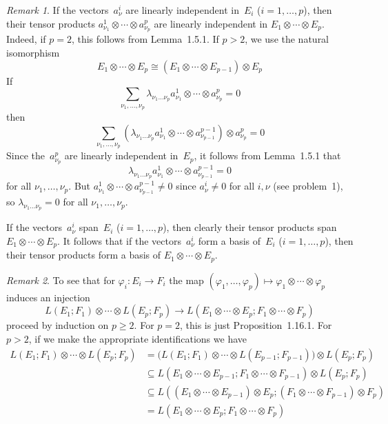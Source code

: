 \documentclass[letterpaper,12pt]{article}
\newcommand{\iso}{\cong}
\newcommand{\tprod}{\otimes}
\newcommand{\multi}[4]{#2_{#3}#1\cdots#1#2_{#4}}
\newcommand{\tprods}[3]{\multi{\tprod}{#1}{#2}{#3}}
\theoremstyle{definition}
\theoremstyle{remark}
\newtheorem*{rmk}{Remark}
\begin{document}
\begin{rmk}
If the vectors~\(a^i_{\nu}\) are linearly independent in~\(E_i\) (\(i=1,\ldots,p\)), then their tensor products \(a^1_{\nu_1}\tprod\cdots\tprod a^p_{\nu_p}\) are linearly independent in \(\tprods{E}{1}{p}\). Indeed, if \(p=2\), this follows from Lemma~1.5.1. If \(p>2\), we use the natural isomorphism
\[\tprods{E}{1}{p}\iso(\tprods{E}{1}{p-1})\tprod E_p\]
If
\[\sum_{\nu_1,\ldots,\nu_p}\lambda_{\nu_1\ldots\nu_p}a^1_{\nu_1}\tprod\cdots\tprod a^p_{\nu_p}=0\]
then
\[\sum_{\nu_1,\ldots,\nu_p}(\lambda_{\nu_1\ldots\nu_p}a^1_{\nu_1}\tprod\cdots\tprod a^{p-1}_{\nu_{p-1}})\tprod a^p_{\nu_p}=0\]
Since the~\(a^p_{\nu_p}\) are linearly independent in~\(E_p\), it follows from Lemma~1.5.1 that
\[\lambda_{\nu_1\ldots\nu_p}a^1_{\nu_1}\tprod\cdots\tprod a^{p-1}_{\nu_{p-1}}=0\]
for all \(\nu_1,\ldots,\nu_p\). But \(a^1_{\nu_1}\tprod\cdots\tprod a^{p-1}_{\nu_{p-1}}\ne 0\) since \(a^i_{\nu}\ne 0\) for all \(i,\nu\) (see problem~1), so \(\lambda_{\nu_1\ldots\nu_p}=0\) for all \(\nu_1,\ldots,\nu_p\).

If the vectors~\(a^i_{\nu}\) span~\(E_i\) (\(i=1,\ldots,p\)), then clearly their tensor products span \(\tprods{E}{1}{p}\). It follows that if the vectors~\(a^i_{\nu}\) form a basis of~\(E_i\) (\(i=1,\ldots,p\)), then their tensor products form a basis of \(\tprods{E}{1}{p}\).
\end{rmk}

\begin{rmk}
To see that for \(\varphi_i:E_i\to F_i\) the map \((\varphi_1,\ldots,\varphi_p)\mapsto\tprods{\varphi}{1}{p}\) induces an injection
\[L(E_1;F_1)\tprod\cdots\tprod L(E_p;F_p)\to L(\tprods{E}{1}{p};\tprods{F}{1}{p})\]
proceed by induction on \(p\ge 2\). For \(p=2\), this is just Proposition~1.16.1. For \(p>2\), if we make the appropriate identifications we have
\begin{align*}
L(E_1;F_1)\tprod\cdots\tprod L(E_p;F_p)&=\bigl(L(E_1;F_1)\tprod\cdots\tprod L(E_{p-1};F_{p-1})\bigr)\tprod L(E_p;F_p)\\
	&\subseteq L(\tprods{E}{1}{p-1};\tprods{F}{1}{p-1})\tprod L(E_p;F_p)\\
	&\subseteq L((\tprods{E}{1}{p-1})\tprod E_p;(\tprods{F}{1}{p-1})\tprod F_p)\\
	&=L(\tprods{E}{1}{p};\tprods{F}{1}{p})
\end{align*}
\end{rmk}
\end{document}
